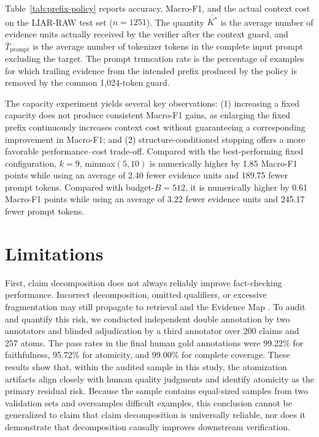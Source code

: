 \documentclass[letterpaper]{article}
\begin{document}
Table~\ref{tab:prefix-policy} reports accuracy, Macro-F1, and the actual context cost on the LIAR-RAW test set ($n{=}1251$). The quantity $\bar{K^\ast}$ is the average number of evidence units actually received by the verifier after the context guard, and $\bar{T}_{\mathrm{prompt}}$ is the average number of tokenizer tokens in the complete input prompt excluding the target. The prompt truncation rate is the percentage of examples for which trailing evidence from the intended prefix produced by the policy is removed by the common 1,024-token guard.

The capacity experiment yields several key observations: (1) increasing a fixed capacity does not produce consistent Macro-F1 gains, as enlarging the fixed prefix continuously increases context cost without guaranteeing a corresponding improvement in Macro-F1; and (2) structure-conditioned stopping offers a more favorable performance--cost trade-off. Compared with the best-performing fixed configuration, $k{=}9$, minmax$(5,10)$ is numerically higher by 1.85 Macro-F1 points while using an average of 2.40 fewer evidence units and 189.75 fewer prompt tokens. Compared with budget-$B{=}512$, it is numerically higher by 0.61 Macro-F1 points while using an average of 3.22 fewer evidence units and 245.17 fewer prompt tokens.

\section{Limitations}

First, claim decomposition does not always reliably improve fact-checking performance. Incorrect decomposition, omitted qualifiers, or excessive fragmentation may still propagate to retrieval and the Evidence Map \citep{Hu2025DecompositionDilemmas}. To audit and quantify this risk, we conducted independent double annotation by two annotators and blinded adjudication by a third annotator over 200 claims and 257 atoms. The pass rates in the final human gold annotations were 99.22\% for faithfulness, 95.72\% for atomicity, and 99.00\% for complete coverage. These results show that, within the audited sample in this study, the atomization artifacts align closely with human quality judgments and identify atomicity as the primary residual risk. Because the sample contains equal-sized samples from two validation sets and oversamples difficult examples, this conclusion cannot be generalized to claim that claim decomposition is universally reliable, nor does it demonstrate that decomposition causally improves downstream verification.
\end{document}
